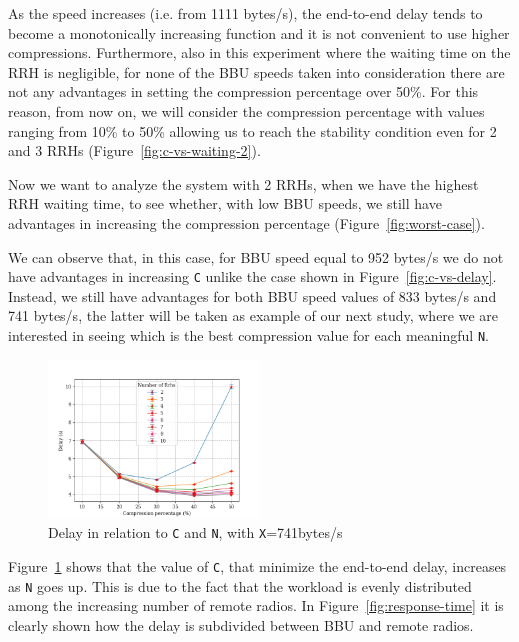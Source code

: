 \documentclass[11pt,a4paper,oneside, openright]{article}
\begin{document}
As the speed increases (i.e. from 1111 bytes/s), the end-to-end delay tends to become a monotonically increasing function and it is not convenient to use higher compressions. Furthermore, also in this experiment where the waiting time on the RRH is negligible, for none of the BBU speeds taken into consideration there are not any advantages in setting the compression percentage over 50\%. For this reason, from now on, we will consider the compression percentage with values ranging from 10\% to 50\% allowing us to reach the stability condition even for 2 and 3 RRHs (Figure~\ref{fig:c-vs-waiting-2}).

Now we want to analyze the system with 2 RRHs, when we have the highest RRH waiting time, to see whether, with low BBU speeds, we still have advantages in increasing the compression percentage (Figure~\ref{fig:worst-case}).

We can observe that, in this case, for BBU speed equal to 952 bytes/s we do not have advantages in increasing \texttt{C} unlike the case shown in Figure~\ref{fig:c-vs-delay}. Instead, we still have advantages for both BBU speed values of 833 bytes/s and 741 bytes/s, the latter will be taken as example of our next study, where we are interested in seeing which is the best compression value for each meaningful \texttt{N}.

\begin{figure}[h]
\centering
  \centering
  \includegraphics[width=0.5\textwidth]{images/c-vs-delay-741}
  \caption{Delay in relation to \texttt{C} and \texttt{N}, with \texttt{X}=741bytes/s}
  \label{fig:c-vs-delay-741}
\end{figure}


Figure~\ref{fig:c-vs-delay-741} shows that the value of \texttt{C}, that minimize the end-to-end delay, increases as \texttt{N} goes up. This is due to the fact that the workload is evenly distributed among the increasing number of remote radios. In Figure~\ref{fig:response-time} it is clearly shown how the delay is subdivided between BBU and remote radios.
\end{document}
